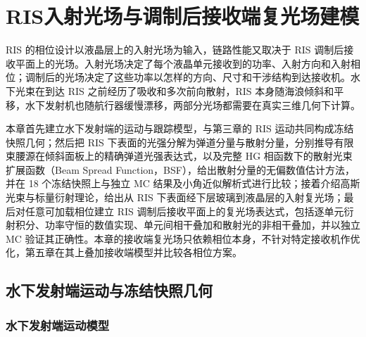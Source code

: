 \chapter{RIS入射光场与调制后接收端复光场建模}
\label{chap:bsf}

RIS 的相位设计以液晶层上的入射光场为输入，链路性能又取决于 RIS 调制后接收平面上的光场。入射光场决定了每个液晶单元接收到的功率、入射方向和入射相位；调制后的光场决定了这些功率以怎样的方向、尺寸和干涉结构到达接收机。水下光束在到达 RIS 之前经历了吸收和多次前向散射，RIS 本身随海浪倾斜和平移，水下发射机也随航行器缓慢漂移，两部分光场都需要在真实三维几何下计算。

本章首先建立水下发射端的运动与跟踪模型，与第三章的 RIS 运动共同构成冻结快照几何；然后把 RIS 下表面的光强分解为弹道分量与散射分量，分别推导有限束腰源在倾斜面板上的精确弹道光强表达式，以及完整 HG 相函数下的散射光束扩展函数（Beam Spread Function，BSF），给出散射分量的无偏数值估计方法，并在 18 个冻结快照上与独立 MC 结果及小角近似解析式进行比较；接着介绍高斯光束与标量衍射理论，给出从 RIS 下表面经下层玻璃到液晶层的入射复光场；最后对任意可加载相位建立 RIS 调制后接收平面上的复光场表达式，包括逐单元衍射积分、功率守恒的数值实现、单元间相干叠加和散射光的非相干叠加，并以独立 MC 验证其正确性。本章的接收端复光场只依赖相位本身，不针对特定接收机作优化，第五章在其上叠加接收端模型并比较各相位方案。

\section{水下发射端运动与冻结快照几何}
\label{sec:c4_geometry}

\subsection{水下发射端运动模型}

